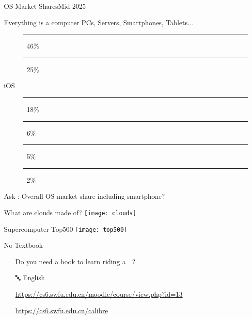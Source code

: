 \begin{frame}{OS Market Shares}{Mid 2025}
  \begin{block}{Everything is a computer}
    PCs, Servers, Smartphones, Tablets...
    \begin{description}
    \item[\android] \textcolor{Green}{\rule{.46\textwidth}{2mm}}\,
      46\%
    \item[\win] \textcolor{SkyBlue}{\rule{.25\textwidth}{2mm}}\, 25\%
    \item[iOS] \textcolor{LightGray}{\rule{.18\textwidth}{2mm}}\, 18\%
    \item[\apple] \textcolor{LightGray}{\rule{.06\textwidth}{2mm}}\, 6\%
    \item[\linux] \rule{.05\textwidth}{2mm}\, 5\%
    \item[\chrome] \textcolor{Orange}{\rule{.02\textwidth}{2mm}}\,
      2\%
    \end{description}
  \end{block}
  \vfill
  \begin{flushright}\footnotesize
    Ask \chatgpt{}: Overall OS market share including smartphone?
  \end{flushright}
\end{frame}

\begin{frame}{What are clouds made of?}
  \centering\texttt{[image: clouds]}
\end{frame}

\begin{frame}{Supercomputer Top500}
  \centering\texttt{[image: top500]}
\end{frame}

\begin{frame}{No Textbook}%
  \begin{itemize}
  \item[\nerd{}] Do you need a book to learn riding a\hspace{.5ex} {\LARGE\nerd \;} ?%
  \item[{\GG}]\google
  \item[🔤] {\purisa English}
  \item[\moodle] \url{https://cs6.swfu.edu.cn/moodle/course/view.php?id=13}
  \item[{\small\openbook\;}] \url{https://cs6.swfu.edu.cn/calibre}
  \end{itemize}
\end{frame}

